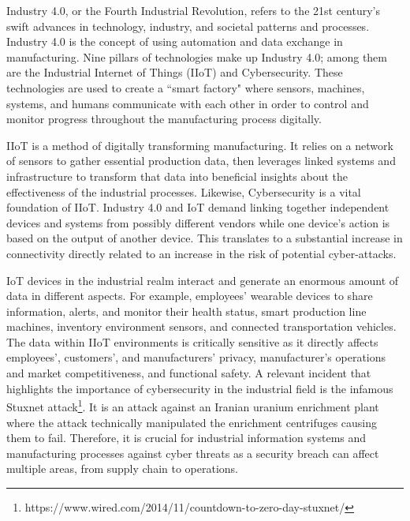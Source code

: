 Industry 4.0, or the Fourth Industrial Revolution, refers to the 21st century's swift advances in technology, industry, and societal patterns and processes. Industry 4.0 is the concept of using automation and data exchange in manufacturing. Nine pillars of technologies make up Industry 4.0; among them are the Industrial Internet of Things (IIoT) and Cybersecurity. These technologies are used to create a ``smart factory" where sensors, machines, systems, and humans communicate with each other in order to control and monitor progress throughout the manufacturing process digitally.
\par
IIoT is a method of digitally transforming manufacturing. It relies on a network of sensors to gather essential production data, then leverages linked systems and infrastructure to transform that data into beneficial insights about the effectiveness of the industrial processes. Likewise, Cybersecurity is a vital foundation of IIoT. Industry 4.0 and IoT demand linking together independent devices and systems from possibly different vendors while one device’s action is based on the output of another device. This translates to a substantial increase in connectivity directly related to an increase in the risk of potential cyber-attacks.
\par
IoT devices in the industrial realm interact and generate an enormous amount of data in different aspects. For example, employees' wearable devices to share information, alerts, and monitor their health status, smart production line machines, inventory environment sensors, and connected transportation vehicles.	The data within IIoT environments is critically sensitive as it directly affects employees', customers', and manufacturers' privacy, manufacturer's operations and market competitiveness, and functional safety.
A relevant incident that highlights the importance of cybersecurity in the industrial field is the infamous Stuxnet attack\footnote{https://www.wired.com/2014/11/countdown-to-zero-day-stuxnet/}. It is an attack against an Iranian uranium enrichment plant where the attack technically manipulated the enrichment centrifuges causing them to fail. Therefore, it is crucial for industrial information systems and manufacturing processes against cyber threats as a security breach can affect multiple areas, from supply chain to operations.
